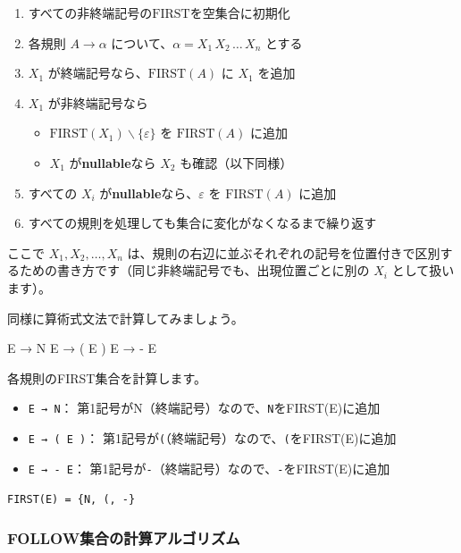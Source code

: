 \begin{enumerate}
\item
  すべての非終端記号の\(\mathrm{FIRST}\)を空集合に初期化
\item
  各規則 \(A \to \alpha\) について、\(\alpha = X_1\,X_2\,\ldots\,X_n\) とする
\item
  \(X_1\) が終端記号なら、\(\mathrm{FIRST}(A)\) に \(X_1\) を追加
\item
  \(X_1\) が非終端記号なら

  \begin{itemize}
  \item
    \(\mathrm{FIRST}(X_1) \mathbin{\backslash} \{\varepsilon\}\) を
    \(\mathrm{FIRST}(A)\) に追加
  \item
    \(X_1\) が\textbf{\sffamily nullable}なら \(X_2\) も確認（以下同様）
  \end{itemize}
\item
  すべての \(X_i\) が\textbf{\sffamily nullable}なら、\(\varepsilon\) を
  \(\mathrm{FIRST}(A)\) に追加
\item
  すべての規則を処理しても集合に変化がなくなるまで繰り返す
\end{enumerate}

ここで \(X_1, X_2, \ldots, X_n\)
は、規則の右辺に並ぶそれぞれの記号を位置付きで区別するための書き方です（同じ非終端記号でも、出現位置ごとに別の
\(X_i\) として扱います）。

同様に算術式文法で計算してみましょう。

\begin{codescreen}{}
E → N
E → ( E )
E → - E
\end{codescreen}

各規則のFIRST集合を計算します。

\begin{itemize}
\item
  \texttt{E\ →\ N}：
  第1記号がN（終端記号）なので、\texttt{N}をFIRST(E)に追加
\item
  \texttt{E\ →\ (\ E\ )}：
  第1記号が\texttt{(}（終端記号）なので、\texttt{(}をFIRST(E)に追加
\item
  \texttt{E\ →\ -\ E}：
  第1記号が\texttt{-}（終端記号）なので、\texttt{-}をFIRST(E)に追加
\end{itemize}

\texttt{FIRST(E)\ =\ \{N,\ \textquotesingle{}(\textquotesingle{},\ \textquotesingle{}-\textquotesingle{}\}}

\subsubsection{FOLLOW集合の計算アルゴリズム}

